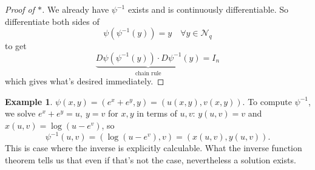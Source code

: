 \documentclass[a4paper]{article}
\theoremstyle{definition}
\newtheorem{eg}[defn]{Example}
\begin{document}
\begin{proof}[Proof of $\ast$]
We already have $\psi^{-1}$ exists and is continuously differentiable. So differentiate both sides of
\[
\psi \left( \psi^{-1} (y) \right)=y \quad \forall y \in \mathcal N_q
\]
to get
\[
\underbrace{D\psi \left(\psi^{-1}(y)\right) \cdot D\psi^{-1}(y)}_{\text{chain rule}} = I_n
\]
which gives what's desired immediately.
\end{proof}
\begin{eg}
$\psi(x,y)=\left(e^x+e^y,y\right) = \left(u(x,y),v(x,y)\right)$. To compute $\psi^{-1}$, we solve $e^x+e^y=u,\ y=v$ for $x,y$ in terms of $u,v$: $y(u,v)=v$ and $x(u,v)=\log \left(u-e^v\right)$, so
\[
\psi^{-1}(u,v) = \left(\log \left(u-e^v\right),v\right) = (x(u,v),y(u,v)).
\]
This is case where the inverse is explicitly calculable. What the inverse function theorem tells us that even if that's not the case, nevertheless a solution exists.
\end{eg}
\end{document}
